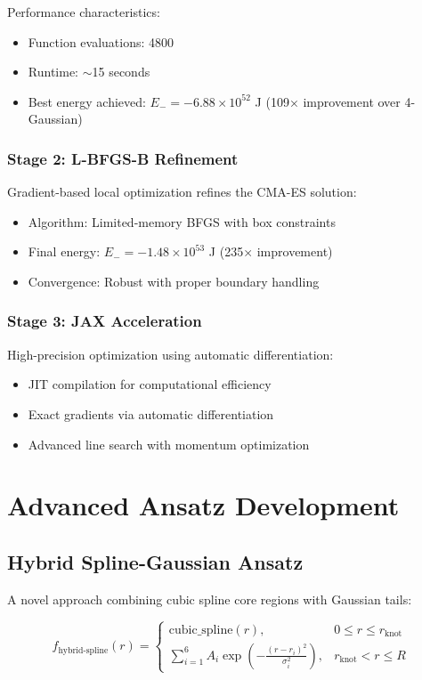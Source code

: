 \documentclass[11pt,a4paper]{article}
\begin{document}
Performance characteristics:
\begin{itemize}
\item Function evaluations: 4800
\item Runtime: $\sim$15 seconds
\item Best energy achieved: $E_- = -6.88 \times 10^{52}$ J (109× improvement over 4-Gaussian)
\end{itemize}

\subsubsection{Stage 2: L-BFGS-B Refinement}

Gradient-based local optimization refines the CMA-ES solution:
\begin{itemize}
\item Algorithm: Limited-memory BFGS with box constraints
\item Final energy: $E_- = -1.48 \times 10^{53}$ J (235× improvement)
\item Convergence: Robust with proper boundary handling
\end{itemize}

\subsubsection{Stage 3: JAX Acceleration}

High-precision optimization using automatic differentiation:
\begin{itemize}
\item JIT compilation for computational efficiency
\item Exact gradients via automatic differentiation
\item Advanced line search with momentum optimization
\end{itemize}

\section{Advanced Ansatz Development}

\subsection{Hybrid Spline-Gaussian Ansatz}

A novel approach combining cubic spline core regions with Gaussian tails:

\begin{equation}
f_{\text{hybrid-spline}}(r) = \begin{cases}
\text{cubic\_spline}(r), & 0 \leq r \leq r_{\text{knot}} \\
\sum_{i=1}^{6} A_i \exp\left(-\frac{(r - r_i)^2}{\sigma_i^2}\right), & r_{\text{knot}} < r \leq R
\end{cases}
\end{equation}
\end{document}
